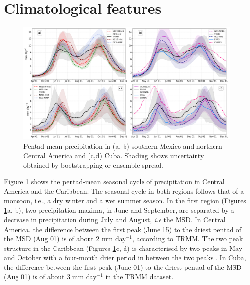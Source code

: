 \section{Climatological features}
\label{sq:msdclim}
 \begin{figure}[t!]
\includegraphics[width=\linewidth]{figures/pmean_f.png}
\caption{Pentad-mean precipitation in (a, b) southern Mexico and northern Central America and (c,d) Cuba. Shading shows uncertainty obtained by bootstrapping or ensemble spread. }
\label{fig:msdcaribb}
\end{figure}

Figure \ref{fig:msdcaribb} shows the pentad-mean seasonal cycle of precipitation in Central America and the Caribbean. The seasonal cycle in both regions follows that of a monsoon, i.e., a dry winter and a wet summer season. In the first region (Figures \ref{fig:msdcaribb}a, b), two precipitation maxima, in June and September, are separated by a decrease in precipitation during July and August, \textit{i.e} the MSD. In Central America, the difference between the first peak (June 15) to the driest pentad of the MSD (Aug 01) is of about 2 mm day$^{-1}$, according to TRMM. 
 The two peak structure in the Caribbean (Figures \ref{fig:msdcaribb}c, d) is characterised by two peaks in May and October with a four-month drier period in between the two peaks  \citep[e.g.][]{giannini2000,gamble2008,angeles2010origins}. In Cuba, the difference between the first peak (June 01) to the driest pentad of the MSD (Aug 01) is of about 3 mm day$^{-1}$ in the TRMM dataset. 
 

